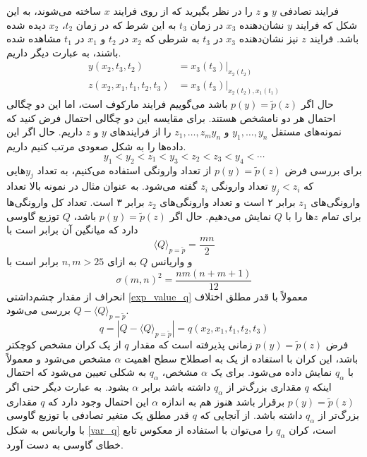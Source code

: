 فرایند تصادفی $y$ و $z$ را در نظر بگیرید که از روی فرایند $x$ ساخته می‌شوند، به این شکل که فرایند $y$ نشان‌دهنده $x_{3}$  در زمان $t_{3}$ به این شرط که در زمان $t_{2}$، $x_{2}$ دیده شده باشد. فرایند $z$ نیز نشان‌دهنده $x_{3}$ در $t_{3}$ به شرطی که $x_{2}$ در $t_{2}$ و $x_{1}$ در $t_{1}$ مشاهده شده باشند، به عبارت دیگر داریم.
\begin{equation}
\begin{aligned} y\left(x_{2}, t_{3}, t_{2}\right) &=\left.x_{3}\left(t_{3}\right)\right|_{x_{2}\left(t_{2}\right)} \\ z\left(x_{2}, x_{1}, t_{1}, t_{2}, t_{3}\right) &=\left.x_{3}\left(t_{3}\right)\right|_{x_{2}\left(t_{2}\right), x_{1}\left(t_{1}\right)} \end{aligned}
\end{equation}
حال اگر $p(y) = \tilde{p}(z)$ باشد می‌گوییم فرایند مارکوف است، اما این دو چگالی احتمال هر دو نامشخص هستند. برای مقایسه این دو چگالی احتمال فرض کنید که نمونه‌های مستقل $y_{1}, \dotsc ,y_{n}$ و $z_{1}, \dotsc ,z_{m} y_{n}$ را از فرایندهای $y$ و $z$ داریم. حال اگر این داده‌ها را به شکل صعودی مرتب کنیم داریم.
\begin{equation}
y_{1}<y_{2}<z_{1}<y_{3}<z_{2}<z_{3}<y_{4}<\cdots
\end{equation}
برای بررسی فرض $p(y) = \tilde{p}(z)$ از تعداد وارونگی استفاده می‌کنیم، به تعداد $y_{j}$هایی که $y_{j} < z_{i}$ تعداد وارونگی $z_{i}$ گفته می‌شود. به عنوان مثال در نمونه بالا تعداد وارونگی‌های $z_{1}$ برابر ۲ است و تعداد وارونگی‌های $z_{2}$ برابر ۳ است. تعداد کل وارونگی‌ها برای تمام $z$ها را با $Q$ نمایش می‌دهیم. حال اگر $p(y) = \tilde{p}(z)$ باشد، $Q$ توزیع گاوسی دارد که میانگین آن برابر است با
\begin{equation}
\langle Q\rangle_{p=\tilde{p}}=\frac{m n}{2}
\label{exp_value_q}
\end{equation}
و واریانس $Q$ به ازای $n, m > 25$ برابر است با
\begin{equation}
  \sigma(m, n)^{2}=\frac{n m(n+m+1)}{12}
  \label{var_q}
\end{equation}
انحراف از مقدار چشم‌داشتی \ref{exp_value_q} معمولاً با قدر مطلق اختلاف $Q - \langle Q\rangle_{p=\tilde{p}}$ بررسی می‌شود.
\begin{equation}
  q=| Q-\langle Q\rangle_{p=\tilde{p}} | =q\left(x_{2}, x_{1}, t_{1}, t_{2}, t_{3}\right)
\end{equation}
فرض $p(y) = \tilde{p}(z)$ زمانی پذیرفته است که مقدار $q$ از یک کران مشخص کوچکتر باشد، این کران با استفاده از  یک به اصطلاح سطح اهمیت $\alpha$ مشخص می‌شود و معمولاً با $q_{\alpha}$ نمایش داده می‌شود. برای یک $\alpha$ مشخص، $q_{\alpha}$ به شکلی تعیین می‌شود که احتمال اینکه $q$ مقداری بزرگ‌تر از $q_{\alpha}$ داشته باشد برابر $\alpha$ بشود. به عبارت دیگر حتی اگر $p(y) = \tilde{p}(z)$ برقرار باشد هنوز هم به اندازه $\alpha$ این احتمال وجود دارد که $q$ مقداری بزرگ‌تر از $q_{\alpha}$ داشته باشد.
از آنجایی که $q$ قدر مطلق یک متغیر تصادفی با توزیع گاوسی با واریانس به شکل \ref{var_q} است، کران $q_{\alpha}$ را می‌توان با استفاده از معکوس تابع خطای گاوسی به دست آورد.\cite{waechter_stochastic_2004, wilcoxon_individual_1945, renner_experimental_2001, tutkun2004markovian}


